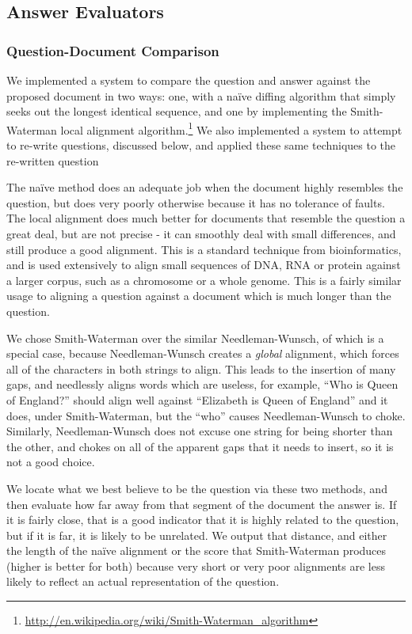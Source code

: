 \documentclass{article}
\begin{document}
\subsection{Answer Evaluators}

\subsubsection{Question-Document Comparison}

We implemented a system to compare the question and answer against the proposed
document in two ways:  one, with a na\"ive diffing algorithm that simply seeks
out the longest identical sequence, and one by implementing the Smith-Waterman
local alignment
algorithm.\footnote{\url{http://en.wikipedia.org/wiki/Smith-Waterman_algorithm}}
We also implemented a system to attempt to re-write questions, discussed below,
and applied these same techniques to the re-written question

The na\"ive method does an adequate job when the document highly resembles the
question, but does very poorly otherwise because it has no tolerance of faults.
The local alignment does much better for documents that resemble the question a
great deal, but are not precise - it can smoothly deal with small differences,
and still produce a good alignment.  This is a standard technique from
bioinformatics, and is used extensively to align small sequences of DNA, RNA or
protein against a larger corpus, such as a chromosome or a whole genome.  This
is a fairly similar usage to aligning a question against a document which is
much longer than the question.

We chose Smith-Waterman over the similar Needleman-Wunsch, of which is a special
case, because Needleman-Wunsch creates a \emph{global} alignment, which forces
all of the characters in both strings to align.  This leads to the insertion of
many gaps, and needlessly aligns words which are useless, for example, ``Who is
Queen of England?'' should align well against ``Elizabeth is Queen of England''
and it does, under Smith-Waterman, but the ``who'' causes Needleman-Wunsch to
choke.  Similarly, Needleman-Wunsch does not excuse one string for being shorter
than the other, and chokes on all of the apparent gaps that it needs to insert,
so it is not a good choice.

We locate what we best believe to be the question via these two methods, and
then evaluate how far away from that segment of the document the answer is.  If
it is fairly close, that is a good indicator that it is highly related to the
question, but if it is far, it is likely to be unrelated.  We output that
distance, and either the length of the na\"ive alignment or the score that
Smith-Waterman produces (higher is better for both) because very short or very
poor alignments are less likely to reflect an actual representation of the
question.
\end{document}
